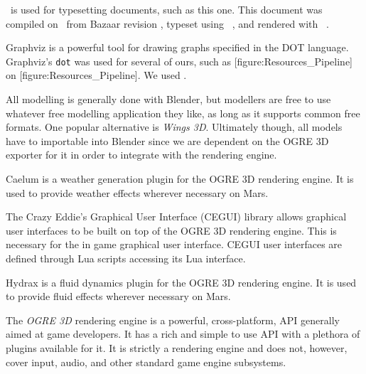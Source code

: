 
\startitemize[4]
\setupwhitespace[big]
\head {\em \CONTEXT}

\CONTEXT\ is used for typesetting documents, such as this one. This document was compiled on \currentdate\ from Bazaar revision \BazaarRevision, typeset using \CONTEXT\ \contextversion, and rendered with \texenginename\ \texengineversion.


Graphviz is a powerful tool for drawing graphs specified in the DOT language. Graphviz's {\tt dot} was used for several of ours, such as [figure:Resources_Pipeline] on [figure:Resources_Pipeline]. We used \GraphvizVersion.
\stopitemize


\startitemize[4]
\setupwhitespace[big]

All modelling is generally done with Blender, but modellers are free to use whatever free modelling application they like, as long as it supports common free formats. One popular alternative is {\it Wings 3D}. Ultimately though, all models have to importable into Blender since we are dependent on the OGRE 3D exporter for it in order to integrate with the rendering engine.


Caelum is a weather generation plugin for the OGRE 3D rendering engine. It is used to provide weather effects wherever necessary on Mars.


The Crazy Eddie's Graphical User Interface (CEGUI) library allows graphical user interfaces to be built on top of the OGRE 3D rendering engine. This is necessary for the in game graphical user interface. CEGUI user interfaces are defined through Lua scripts accessing its Lua interface.


Hydrax is a fluid dynamics plugin for the OGRE 3D rendering engine. It is used to provide fluid effects wherever necessary on Mars.


The {\it OGRE 3D} rendering engine is a powerful, cross-platform, API generally aimed at game developers. It has a rich and simple to use API with a plethora of plugins available for it. It is strictly a rendering engine and does not, however, cover input, audio, and other standard game engine subsystems.


